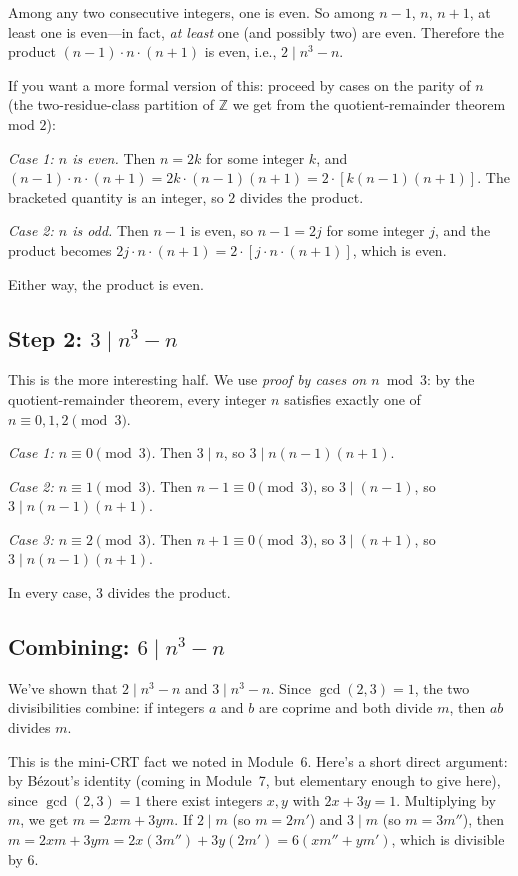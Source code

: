 \documentclass[11pt]{article}
\begin{document}
Among any two consecutive integers, one is even. So among $n-1$, $n$, $n+1$, at least one is even---in fact, \emph{at least} one (and possibly two) are even. Therefore the product $(n-1) \cdot n \cdot (n+1)$ is even, i.e., $2 \mid n^3 - n$.

If you want a more formal version of this: proceed by cases on the parity of $n$ (the two-residue-class partition of $\mathbb{Z}$ we get from the quotient-remainder theorem mod $2$):

\emph{Case 1: $n$ is even.} Then $n = 2k$ for some integer $k$, and $(n-1) \cdot n \cdot (n+1) = 2k \cdot (n-1)(n+1) = 2 \cdot [k(n-1)(n+1)]$. The bracketed quantity is an integer, so $2$ divides the product.

\emph{Case 2: $n$ is odd.} Then $n - 1$ is even, so $n - 1 = 2j$ for some integer $j$, and the product becomes $2j \cdot n \cdot (n+1) = 2 \cdot [j \cdot n \cdot (n+1)]$, which is even.

Either way, the product is even.

\subsection*{Step 2: $3 \mid n^3 - n$}

This is the more interesting half. We use \emph{proof by cases on $n \bmod 3$}: by the quotient-remainder theorem, every integer $n$ satisfies exactly one of $n \equiv 0, 1, 2 \pmod 3$.

\emph{Case 1: $n \equiv 0 \pmod 3$.} Then $3 \mid n$, so $3 \mid n(n-1)(n+1)$.

\emph{Case 2: $n \equiv 1 \pmod 3$.} Then $n - 1 \equiv 0 \pmod 3$, so $3 \mid (n-1)$, so $3 \mid n(n-1)(n+1)$.

\emph{Case 3: $n \equiv 2 \pmod 3$.} Then $n + 1 \equiv 0 \pmod 3$, so $3 \mid (n+1)$, so $3 \mid n(n-1)(n+1)$.

In every case, $3$ divides the product.

\subsection*{Combining: $6 \mid n^3 - n$}

We've shown that $2 \mid n^3 - n$ and $3 \mid n^3 - n$. Since $\gcd(2, 3) = 1$, the two divisibilities combine: if integers $a$ and $b$ are coprime and both divide $m$, then $ab$ divides $m$.

This is the mini-CRT fact we noted in Module~6. Here's a short direct argument: by B\'ezout's identity (coming in Module~7, but elementary enough to give here), since $\gcd(2, 3) = 1$ there exist integers $x, y$ with $2x + 3y = 1$. Multiplying by $m$, we get $m = 2xm + 3ym$. If $2 \mid m$ (so $m = 2m'$) and $3 \mid m$ (so $m = 3m''$), then $m = 2xm + 3ym = 2x(3m'') + 3y(2m') = 6(xm'' + ym')$, which is divisible by $6$.
\end{document}

